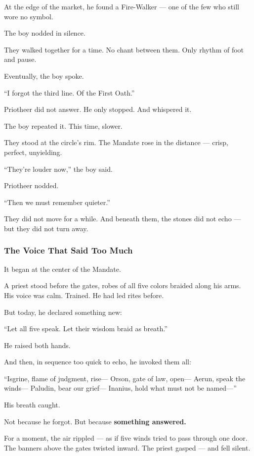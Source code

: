 \documentclass[12pt]{article}
\begin{document}
At the edge of the market, he found a Fire-Walker — one of the few who still wore no symbol.

The boy nodded in silence.

They walked together for a time.  
No chant between them.  
Only rhythm of foot and pause.

Eventually, the boy spoke.

 “I forgot the third line.  
 Of the First Oath.”

Priotheer did not answer.  
He only stopped.  
And whispered it.

The boy repeated it.  
This time, slower.

They stood at the circle’s rim.  
The Mandate rose in the distance — crisp, perfect, unyielding.

 “They’re louder now,” the boy said.

Priotheer nodded.

 “Then we must remember quieter.”

They did not move for a while.  
And beneath them, the stones did not echo —  
but they did not turn away.

\dotfill

\subsubsection*{The Voice That Said Too Much}

It began at the center of the Mandate.

A priest stood before the gates,  
robes of all five colors braided along his arms.  
His voice was calm. Trained.  
He had led rites before.

But today, he declared something new:

 “Let all five speak.  
 Let their wisdom braid as breath.”

He raised both hands.

And then, in sequence too quick to echo,  
he invoked them all:

 “Isgrine, flame of judgment, rise—  
Orson, gate of law, open—  
Aerun, speak the winds—  
Paludin, bear our grief—  
Inanius, hold what must not be named—”

His breath caught.

Not because he forgot.  
But because \textbf{something answered.}

For a moment, the air rippled — as if five winds tried to pass through one door.  
The banners above the gates twisted inward.  
The priest gasped — and fell silent.
\end{document}
